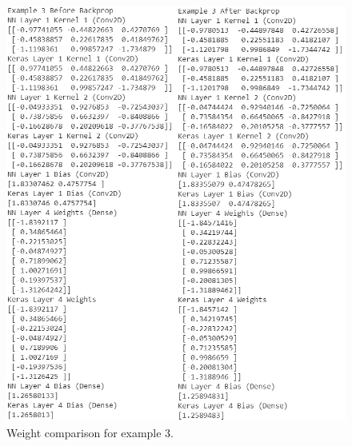 \documentclass[12pt]{article}
\begin{document}
\begin{figure}
  \centering
  \includegraphics[width=\linewidth]{example-3-weights.png}
  \caption{Weight comparison for example 3.}
  \label{fig:e3}
\end{figure}


\end{document}
